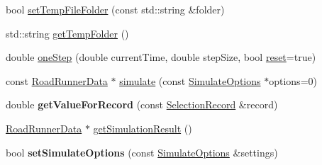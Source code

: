 \begin{DoxyCompactItemize}
\item 
bool \hyperlink{classrr_1_1_road_runner_a61822e0ad53826249e04d72c3f45ab97}{set\-Temp\-File\-Folder} (const std\-::string \&folder)
\item 
std\-::string \hyperlink{classrr_1_1_road_runner_ad16dd282c20c5c144cab252f4e2752f1}{get\-Temp\-Folder} ()
\item 
double \hyperlink{classrr_1_1_road_runner_a27aedd28b2a2d5453200ca4a4a2bf4c0}{one\-Step} (double current\-Time, double step\-Size, bool \hyperlink{classrr_1_1_road_runner_ae4b0eaa39fd37737e5f5fd7f7741e06c}{reset}=true)
\item 
const \hyperlink{classrr_1_1_road_runner_data}{Road\-Runner\-Data} $\ast$ \hyperlink{classrr_1_1_road_runner_ae380c9a35cca24a7c35633bcd4c6836c}{simulate} (const \hyperlink{structrr_1_1_simulate_options}{Simulate\-Options} $\ast$options=0)
\item 
\hypertarget{classrr_1_1_road_runner_ab6f650b0473ff4b7432ff4fb8f2a9c61}{double {\bfseries get\-Value\-For\-Record} (const \hyperlink{classrr_1_1_selection_record}{Selection\-Record} \&record)}\label{classrr_1_1_road_runner_ab6f650b0473ff4b7432ff4fb8f2a9c61}

\item 
\hyperlink{classrr_1_1_road_runner_data}{Road\-Runner\-Data} $\ast$ \hyperlink{classrr_1_1_road_runner_aaf6508bdeb579b0eb79ec1cf23acc319}{get\-Simulation\-Result} ()
\item 
\hypertarget{classrr_1_1_road_runner_a8287ad042995275ccc20c92e9f4ccb9c}{bool {\bfseries set\-Simulate\-Options} (const \hyperlink{structrr_1_1_simulate_options}{Simulate\-Options} \&settings)}\label{classrr_1_1_road_runner_a8287ad042995275ccc20c92e9f4ccb9c}


\end{DoxyCompactItemize}
